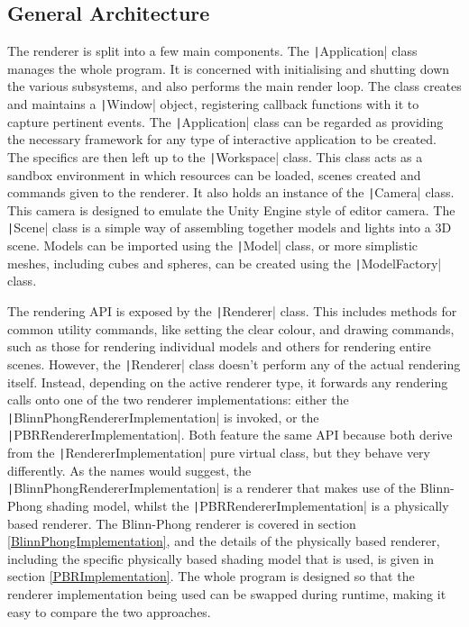 \subsection{General Architecture}

The renderer is split into a few main components. The \texttt|Application| class manages the whole program. It is concerned with initialising and shutting down the various subsystems, and also performs the main render loop. The class creates and maintains a \texttt|Window| object, registering callback functions with it to capture pertinent events. The \texttt|Application| class can be regarded as providing the necessary framework for any type of interactive application to be created. The specifics are then left up to the \texttt|Workspace| class. This class acts as a sandbox environment in which resources can be loaded, scenes created and commands given to the renderer. It also holds an instance of the \texttt|Camera| class. This camera is designed to emulate the Unity Engine style of editor camera. The \texttt|Scene| class is a simple way of assembling together models and lights into a 3D scene. Models can be imported using the \texttt|Model| class, or more simplistic meshes, including cubes and spheres, can be created using the \texttt|ModelFactory| class.

The rendering API is exposed by the \texttt|Renderer| class. This includes methods for common utility commands, like setting the clear colour, and drawing commands, such as those for rendering individual models and others for rendering entire scenes. However, the \texttt|Renderer| class doesn't perform any of the actual rendering itself. Instead, depending on the active renderer type, it forwards any rendering calls onto one of the two renderer implementations: either the \texttt|BlinnPhongRendererImplementation| is invoked, or the \texttt|PBRRendererImplementation|. Both feature the same API because both derive from the \texttt|RendererImplementation| pure virtual class, but they behave very differently. As the names would suggest, the \texttt|BlinnPhongRendererImplementation| is a renderer that makes use of the Blinn-Phong shading model, whilst the \texttt|PBRRendererImplementation| is a physically based renderer. The Blinn-Phong renderer is covered in section \ref{BlinnPhongImplementation}, and the details of the physically based renderer, including the specific physically based shading model that is used, is given in section \ref{PBRImplementation}. The whole program is designed so that the renderer implementation being used can be swapped during runtime, making it easy to compare the two approaches.

